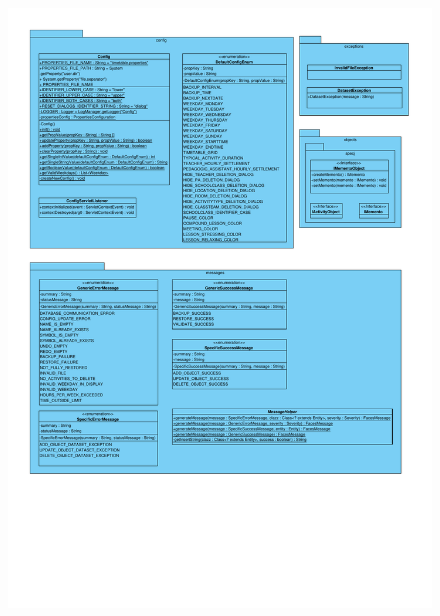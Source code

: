 \documentclass[fontsize=12pt,paper=a4,twoside]{scrartcl}
\begin{document}
\begin{figure}[H]
\includegraphics[width=\textwidth]{common.pdf}
\end{figure}
\newpage
\end{document}
